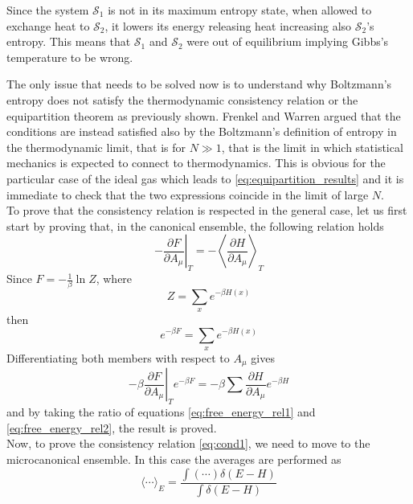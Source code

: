 Since the system $\mathcal{S}_1$ is not in its maximum entropy state, when allowed to exchange heat to $\mathcal{S}_2$, it lowers its energy releasing heat increasing also $\mathcal{S}_2$'s entropy.
This means that $\mathcal{S}_1$ and $\mathcal{S}_2$ were out of equilibrium implying Gibbs's temperature to be wrong. \par
\vspace{10pt}
The only issue that needs to be solved now is to understand why Boltzmann's entropy does not satisfy the thermodynamic consistency relation or the equipartition theorem as previously shown. Frenkel and Warren argued that the conditions are instead satisfied also by the Boltzmann's definition of entropy in the thermodynamic limit, that is for $N \gg 1$, that is the limit in which statistical mechanics is expected to connect to thermodynamics.
This is obvious for the particular case of the ideal gas which leads to \ref{eq:equipartition_results} and it is immediate to check that the two expressions coincide in the limit of large $N$. \\
To prove that the consistency relation is respected in the general case, let us first start by proving that, in the canonical ensemble, the following relation holds
\begin{equation}
    -\left.\frac{\partial F}{\partial A_{\mu}}\right|_{T}=-\left\langle\frac{\partial H}{\partial A_{\mu}}\right\rangle_{T}
    \label{eq:entropy_eq_1}
\end{equation}
Since $F = -\frac{1}{\beta} \ln Z$, where
\begin{equation*}
    Z = \sum_x e^{-\beta H(x)}
\end{equation*} 
then 
\begin{equation}
    e^{-\beta F}=\sum_x e^{-\beta H(x)}
    \label{eq:free_energy_rel1}
\end{equation}
Differentiating both members with respect to $A_{\mu}$ gives 
\begin{equation}
    -\left.\beta \frac{\partial F}{\partial A_{\mu}}\right|_{T} e^{-\beta F}=-\beta \sum \frac{\partial H}{\partial A_{\mu}} e^{-\beta H}
    \label{eq:free_energy_rel2}
\end{equation}
and by taking the ratio of equations \ref{eq:free_energy_rel1} and \ref{eq:free_energy_rel2}, the result is proved. \\
Now, to prove the consistency relation \ref{eq:cond1}, we need to move to the microcanonical ensemble. In this case the averages are performed as 
\begin{equation*}
    \langle\cdots\rangle_{E}=\frac{\int (\cdots) \delta(E-H)}{\int \delta(E-H)}
\end{equation*}
